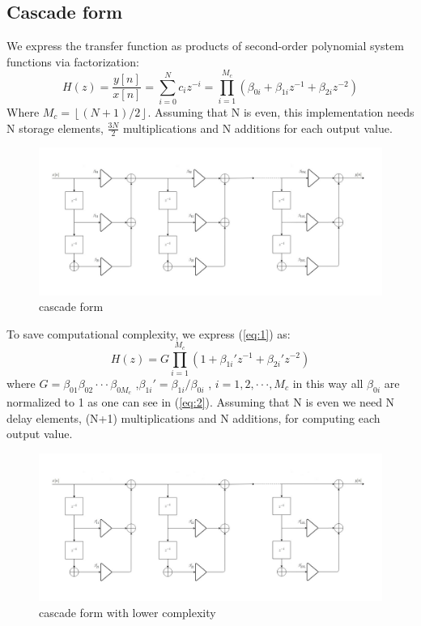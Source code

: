 \subsection{Cascade form}
We express the transfer function as products of second-order polynomial system functions via factorization:
\begin{equation} \label{eq:1}
H(z)=\frac{y[n]}{x[n]} =\sum_{i=0}^{N}c_{i}z^{-i}= \prod_{i=1}^{M_{c}}(\beta_{0i}+\beta_{1i}z^{-1}+\beta_{2i}z^{-2})
\end{equation}
Where $M_{c}= \left \lfloor (N+1)/2 \right \rfloor$.
Assuming that N is even, this implementation needs N storage elements, $\frac{3N}{2}$ multiplications and N additions for each output value.
\begin{figure}[H]
    \centering
    \includegraphics[scale=0.35]{images/cascade.jpg}    
    \caption{cascade form}
    \label{fig:my_label}
\end{figure}
To save computational complexity, we express (\ref{eq:1}) as:
\begin{equation} \label{eq:2}
H(z)= G\prod_{i=1}^{M_{c}}(1+\beta_{1i}'z^{-1}+\beta_{2i}'z^{-2})
\end{equation}
where $G=\beta_{01}\beta_{02} \cdot\cdot\cdot\beta_{0M_{c}}$ ,$\beta_{1i}'=\beta_{1i}/\beta_{0i}$ , $i= 1,2,\cdot \cdot \cdot,M_{c}$ in this way all $\beta_{0i}$ are normalized to 1 as one can see in (\ref{eq:2}). Assuming that N is even we need N delay elements, (N+1) multiplications and N additions, for computing each output value.
\begin{figure}[H]
    \centering
    \includegraphics[scale=0.35]{images/cascadeoptimised.jpg}    
    \caption{cascade form with lower complexity}
    \label{fig:my_label}
\end{figure}
